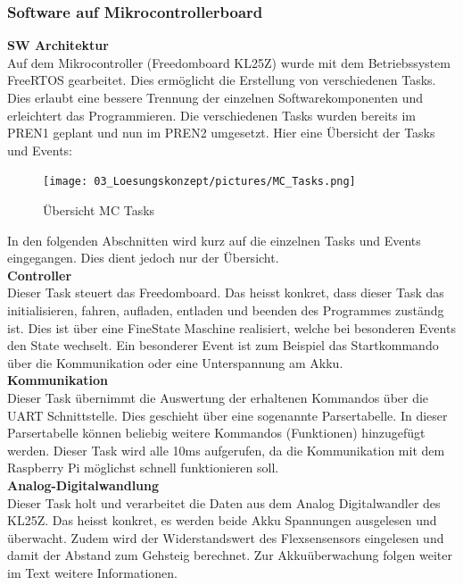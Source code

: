 \subsubsection{Software auf Mikrocontrollerboard}

\textbf{SW Architektur}\\[0.2cm]
Auf dem Mikrocontroller (Freedomboard KL25Z) wurde mit dem Betriebssystem FreeRTOS gearbeitet. Dies ermöglicht die Erstellung von verschiedenen Tasks. Dies erlaubt eine bessere Trennung der einzelnen Softwarekomponenten und erleichtert das Programmieren. Die verschiedenen Tasks wurden bereits im PREN1 geplant und nun im PREN2 umgesetzt. 
Hier eine Übersicht der Tasks und Events:

\begin{figure}[H]
	\centering
	\texttt{[image: 03\_Loesungskonzept/pictures/MC\_Tasks.png]}
	\caption{Übersicht MC Tasks}
\end{figure}
In den folgenden Abschnitten wird kurz auf die einzelnen Tasks und Events eingegangen. Dies dient jedoch nur der Übersicht.
\\[0.2cm]\textbf{Controller}\\[0.2cm]
Dieser Task steuert das Freedomboard. Das heisst konkret, dass dieser Task das initialisieren, fahren, aufladen, entladen  und beenden des Programmes zuständg ist. Dies ist über eine FineState Maschine realisiert, welche bei besonderen Events den State wechselt. Ein besonderer Event ist zum Beispiel das Startkommando über die Kommunikation oder eine Unterspannung am Akku.\\[0.2cm]
\textbf{Kommunikation}\\[0.2cm]
Dieser Task übernimmt die Auswertung der erhaltenen Kommandos über die UART Schnittstelle. Dies geschieht über eine sogenannte Parsertabelle. In dieser Parsertabelle können beliebig weitere Kommandos (Funktionen) hinzugefügt werden. Dieser Task wird alle 10ms aufgerufen, da die Kommunikation mit dem Raspberry Pi möglichst schnell funktionieren soll.\\[0.2cm]
\newpage
\textbf{Analog-Digitalwandlung}\\[0.2cm]
Dieser Task holt und verarbeitet die Daten aus dem Analog Digitalwandler des KL25Z. Das heisst konkret, es werden beide Akku Spannungen ausgelesen und überwacht. Zudem wird der Widerstandswert des Flexsensensors eingelesen und damit der Abstand zum Gehsteig berechnet. Zur Akkuüberwachung folgen weiter im Text weitere Informationen.\\[0.2cm]
